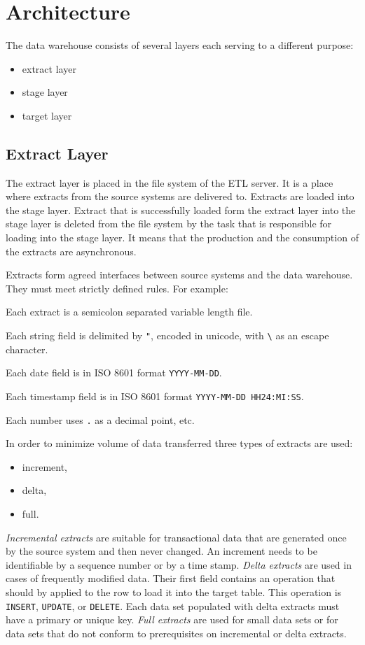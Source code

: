\documentclass[a4paper,12pt,english,oneside]{book}
\begin{document}
\section{Architecture}

The data warehouse consists of several layers each serving to a different purpose:
\begin{itemize}
  \item extract layer
  \item stage layer
  \item target layer
\end{itemize}

\subsection{Extract Layer}

The extract layer is placed in the file system of the ETL server. It is a place where extracts from the source systems are delivered to. Extracts are loaded into the stage layer. Extract that is successfully loaded form the extract layer into the stage layer is deleted from the file system by the task that is responsible for loading into the stage layer. It means that the production and the consumption of the extracts are asynchronous.

Extracts form agreed interfaces between source systems and the data warehouse. They must meet strictly defined rules. For example: \begin{list}{}{}\it
\item Each extract is a semicolon separated variable length file.
\item Each string field is delimited by \verb|"|, encoded in unicode, with \verb|\| as an escape character.
\item Each date field is in ISO 8601 format \verb|YYYY-MM-DD|.
\item Each timestamp field is in ISO 8601 format \verb|YYYY-MM-DD HH24:MI:SS|.
\item Each number uses \verb|.| as a decimal point, etc.
\end{list}

In order to minimize volume of data transferred three types of extracts are used:
\begin{itemize}%
\item increment,
\item delta,
\item full.
\end{itemize}
\emph{Incremental extracts} are suitable for transactional data that are generated once by the source system and then never changed. An increment needs to be identifiable by a sequence number or by a time stamp. \emph{Delta extracts} are used in cases of frequently modified data. Their first field contains an operation that should by applied to the row to load it into the target table. This operation is \verb|INSERT|, \verb|UPDATE|, or \verb|DELETE|. Each data set populated with delta extracts must have a primary or unique key. \emph{Full extracts} are used for small data sets or for data sets that do not conform to prerequisites on incremental or delta extracts.
\end{document}
